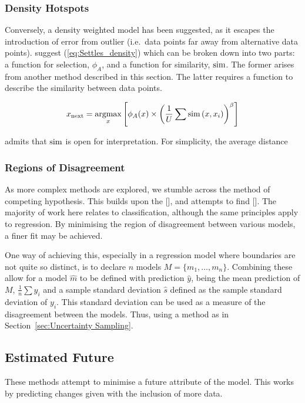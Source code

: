\subsubsection{Density Hotspots}
Conversely, a density weighted model has been suggested, as it escapes the introduction of error from outlier (i.e.\ data points far away from alternative data points). \textcite{Set08} suggest (\ref{eq:Settles_density}) which can be broken down into two parts: a function for selection, $\phi_A$, and a function for similarity, $\operatorname*{sim}$. The former arises from  another method described in this section. The latter requires a function to describe the similarity between data points.

\begin{equation}
  \label{eq:Settles_density}
  x_\mathrm{next}=\operatorname*{argmax}_x{\left[\phi_A(x)\times{\left(\frac{1}{U}\sum{\operatorname*{sim}{(x, x_i)}}\right)}^\beta\right]}
\end{equation}

\textcite{Set08} admits that $\operatorname*{sim}$ is open for interpretation. For simplicity, the average distance

\subsubsection{Regions of Disagreement}
As more complex methods are explored, we stumble across the method of competing hypothesis. This builds upon the [], and attempts to find []. The majority of work here relates to classification, although the same principles apply to regression. By minimising the region of disagreement between various models, a finer fit may be achieved.

One way of achieving this, especially in a regression model where boundaries are not quite so distinct, is to declare $n$ models ${M = \{m_1,\ldots{}, m_n\}}$. Combining these allow for a model $\hat{m}$ to be defined with prediction $\hat{y}$, being the mean prediction of $M$, ${\frac{1}{n}\sum{y_i}}$ and a sample standard deviation $\hat{s}$ defined as the sample standard deviation of $y_i$. This standard deviation can be used as a measure of the disagreement between the models. Thus, using a method as in Section~\ref{sec:Uncertainty Sampling}.

\subsection{Estimated Future}
These methods attempt to minimise a future attribute of the model. This works by predicting changes given with the inclusion of more data.

